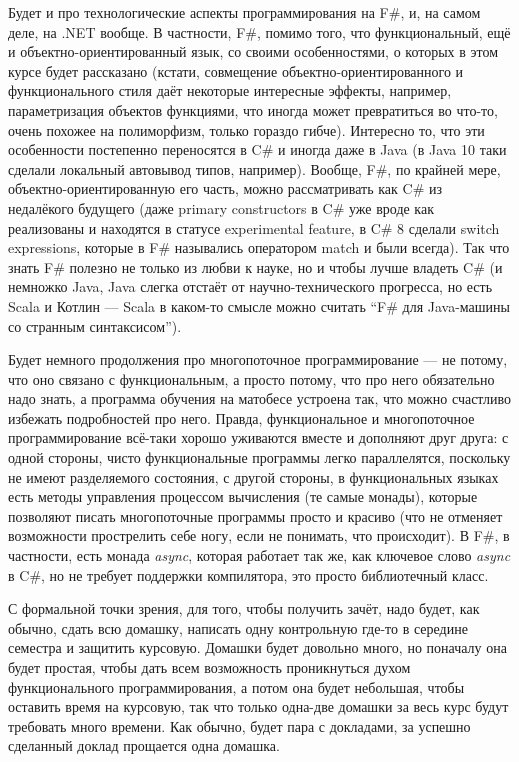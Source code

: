 \documentclass[a5paper]{article}
\begin{document}
Будет и про технологические аспекты программирования на F\#, и, на самом деле, на .NET вообще. В частности, F\#, помимо того, что функциональный, ещё и объектно-ориентированный язык, со своими особенностями, о которых в этом курсе будет рассказано (кстати, совмещение объектно-ориентированного и функционального стиля даёт некоторые интересные эффекты, например, параметризация объектов функциями, что иногда может превратиться во что-то, очень похожее на полиморфизм, только гораздо гибче). Интересно то, что эти особенности постепенно переносятся в C\# и иногда даже в Java (в Java 10 таки сделали локальный автовывод типов, например). Вообще, F\#, по крайней мере, объектно-ориентированную его часть, можно рассматривать как C\# из недалёкого будущего (даже primary constructors в C\# уже вроде как реализованы и находятся в статусе experimental feature, в C\# 8 сделали switch expressions, которые в F\# назывались оператором match и были всегда). Так что знать F\# полезно не только из любви к науке, но и чтобы лучше владеть C\# (и немножко Java, Java слегка отстаёт от научно-технического прогресса, но есть Scala и Котлин --- Scala в каком-то смысле можно считать ``F\# для Java-машины со странным синтаксисом'').

Будет немного продолжения про многопоточное программирование --- не потому, что оно связано с функциональным, а просто потому, что про него обязательно надо знать, а программа обучения на матобесе устроена так, что можно счастливо избежать подробностей про него. Правда, функциональное и многопоточное программирование всё-таки хорошо уживаются вместе и дополняют друг друга: с одной стороны, чисто функциональные программы легко параллелятся, поскольку не имеют разделяемого состояния, с другой стороны, в функциональных языках есть методы управления процессом вычисления (те самые монады), которые позволяют писать многопоточные программы просто и красиво (что не отменяет возможности прострелить себе ногу, если не понимать, что происходит). В F\#, в частности, есть монада \textit{async}, которая работает так же, как ключевое слово \textit{async} в C\#, но не требует поддержки компилятора, это просто библиотечный класс.

С формальной точки зрения, для того, чтобы получить зачёт, надо будет, как обычно, сдать всю домашку, написать одну контрольную где-то в середине семестра и защитить курсовую. Домашки будет довольно много, но поначалу она будет простая, чтобы дать всем возможность проникнуться духом функционального программирования, а потом она будет небольшая, чтобы оставить время на курсовую, так что только одна-две домашки за весь курс будут требовать много времени. Как обычно, будет пара с докладами, за успешно сделанный доклад прощается одна домашка.
\end{document}
